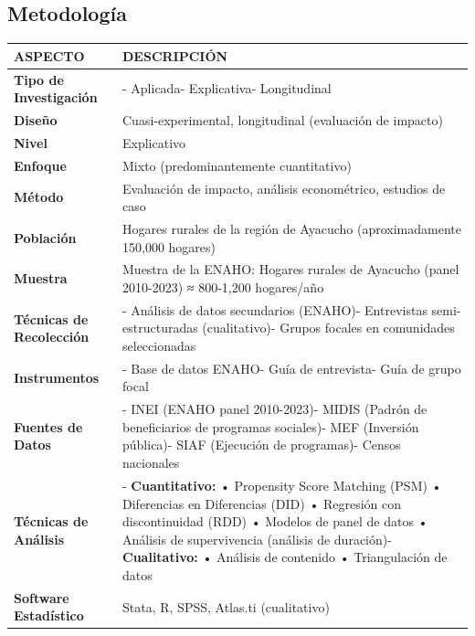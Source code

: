 \documentclass[
  man,
  floatsintext,
  longtable,
  a4paper,
  nolmodern,
  notxfonts,
  notimes,
  12pt,
  colorlinks=true,linkcolor=blue,citecolor=blue,urlcolor=blue]{apa7}
\newcounter{none} %
\begin{document}
\subsection{Metodología}\label{metodologuxeda-7}

{\def\LTcaptype{none} %
\begin{longtable}[]{@{}
  >{\raggedright\arraybackslash}p{}
  >{\raggedright\arraybackslash}p{}@{}}
\toprule\noalign{}
\begin{minipage}[b]{\linewidth}\raggedright
ASPECTO
\end{minipage} & \begin{minipage}[b]{\linewidth}\raggedright
DESCRIPCIÓN
\end{minipage} \\
\midrule\noalign{}
\endhead
\bottomrule\noalign{}
\endlastfoot
\textbf{Tipo de Investigación} & - Aplicada- Explicativa-
Longitudinal \\
\textbf{Diseño} & Cuasi-experimental, longitudinal (evaluación de
impacto) \\
\textbf{Nivel} & Explicativo \\
\textbf{Enfoque} & Mixto (predominantemente cuantitativo) \\
\textbf{Método} & Evaluación de impacto, análisis econométrico, estudios
de caso \\
\textbf{Población} & Hogares rurales de la región de Ayacucho
(aproximadamente 150,000 hogares) \\
\textbf{Muestra} & Muestra de la ENAHO: Hogares rurales de Ayacucho
(panel 2010-2023) ≈ 800-1,200 hogares/año \\
\textbf{Técnicas de Recolección} & - Análisis de datos secundarios
(ENAHO)- Entrevistas semi-estructuradas (cualitativo)- Grupos focales en
comunidades seleccionadas \\
\textbf{Instrumentos} & - Base de datos ENAHO- Guía de entrevista- Guía
de grupo focal \\
\textbf{Fuentes de Datos} & - INEI (ENAHO panel 2010-2023)- MIDIS
(Padrón de beneficiarios de programas sociales)- MEF (Inversión
pública)- SIAF (Ejecución de programas)- Censos nacionales \\
\textbf{Técnicas de Análisis} & - \textbf{Cuantitativo:} • Propensity
Score Matching (PSM) • Diferencias en Diferencias (DID) • Regresión con
discontinuidad (RDD) • Modelos de panel de datos • Análisis de
supervivencia (análisis de duración)- \textbf{Cualitativo:} • Análisis
de contenido • Triangulación de datos \\
\textbf{Software Estadístico} & Stata, R, SPSS, Atlas.ti
(cualitativo) \\
\end{longtable}
}
\end{document}
